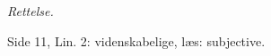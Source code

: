 \documentclass[12pt,a4paper]{book}
\begin{document}
\bigskip
\begin{center}
  \emph{Rettelse.}

  \smallskip
  Side 11, Lin. 2: videnskabelige, læs: subjective.
\end{center}
\end{document}
